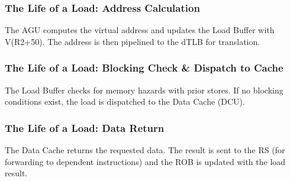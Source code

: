 \documentclass[aspectratio=169,12pt]{beamer}
\begin{document}
\begin{frame}
\frametitle{The Life of a Load: Address Calculation}
\begin{center}
\LoadLifecycleDiagram[
    rat3={RF0},
    robOp={Ld},
    robValid={1},
    robRdy={0},
    robData={X},
    lbV={1},
    lbAddr={\newentry{V(R2+50)}},
    lbBC={0},
    agu={\removedentry{R2+50}},
    arrowDTLB=1
]
\end{center}
\vspace{-2mm}
\begin{tcolorbox}[colback=blue!5!white,colframe=blue!75!black]
The AGU computes the virtual address and updates the Load Buffer with V(R2+50). The address is then pipelined to the dTLB for translation.
\end{tcolorbox}
\end{frame}

\begin{frame}
\frametitle{The Life of a Load: Blocking Check \& Dispatch to Cache}
\begin{center}
\LoadLifecycleDiagram[
    rat3={RF0},
    robOp={Ld},
    robValid={1},
    robRdy={0},
    robData={X},
    lbV={1},
    lbAddr={V(R2+50)},
    lbBC={0},
    arrowCache=1
]
\end{center}
\vspace{-2mm}
\begin{tcolorbox}[colback=blue!5!white,colframe=blue!75!black]
The Load Buffer checks for memory hazards with prior stores. If no blocking conditions exist, the load is dispatched to the Data Cache (DCU).
\end{tcolorbox}
\end{frame}

\begin{frame}
\frametitle{The Life of a Load: Data Return}
\begin{center}
\LoadLifecycleDiagram[
    rat3={RF0},
    robOp={Ld},
    robValid={1},
    robRdy={\newentry{1}},
    robData={\newentry{data}},
    lbV={1},
    lbAddr={V(R2+50)},
    lbBC={0},
    arrowCache=1
]
\end{center}
\vspace{-2mm}
\begin{tcolorbox}[colback=blue!5!white,colframe=blue!75!black]
The Data Cache returns the requested data. The result is sent to the RS (for forwarding to dependent instructions) and the ROB is updated with the load result.
\end{tcolorbox}
\end{frame}
\end{document}
